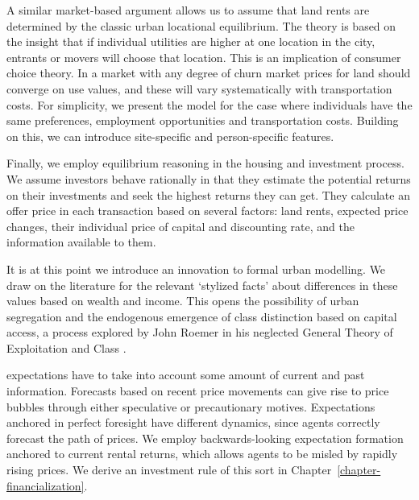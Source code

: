 A similar market-based argument allows us to assume that land rents are determined by the classic urban locational equilibrium. The theory is based on the insight that if individual utilities are higher at one location in the city, entrants or movers will choose that  location. This is an implication of consumer choice theory. In a market with any degree of churn market prices for land should converge on use values, and these will vary systematically with transportation costs. For simplicity, we present the model for the case where individuals have the same preferences, employment opportunities and transportation costs. Building on this, %
we can introduce site-specific and person-specific features. 

Finally, we employ \gls{equilibrium reasoning} in the housing and investment process. We assume investors behave rationally in that they estimate the potential returns on their investments and seek the highest returns they can get. They calculate an offer price in each transaction based on several factors: land rents, expected price changes, their individual price of capital and discounting rate, and the information available to them.

It is at this point we introduce an innovation to formal urban modelling. We draw on the literature for the relevant `\gls{stylized facts}' about differences in these values based on wealth and income. This opens the possibility of urban segregation and the endogenous emergence of \gls{class} distinction based on capital access, a process explored by John Roemer in his neglected General Theory of Exploitation and Class \cite{roemerGeneralTheoryExploitation1982}.  

\Gls{expectations} have to take into account some amount of current and past information. Forecasts based on recent price movements can give rise to price bubbles through either speculative or precautionary motives. Expectations anchored in \gls{perfect foresight} have different dynamics, since agents correctly forecast the path of prices. We employ backwards-looking expectation formation anchored 
to current rental returns, which allows agents to be misled by rapidly rising prices. We derive an investment rule of this sort in Chapter~\ref{chapter-financialization}. 

